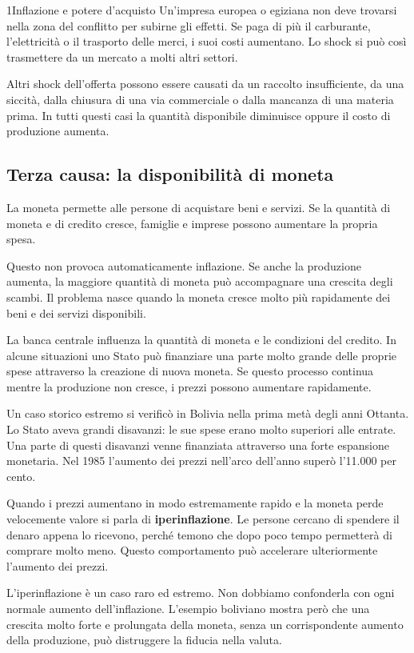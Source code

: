\begin{lettura}{1}{Inflazione e potere d’acquisto}
Un'impresa europea o egiziana non deve trovarsi nella zona del conflitto per subirne gli effetti. Se paga di più il carburante, l'elettricità o il trasporto delle merci, i suoi costi aumentano. Lo shock si può così trasmettere da un mercato a molti altri settori.

Altri shock dell'offerta possono essere causati da un raccolto insufficiente, da una siccità, dalla chiusura di una via commerciale o dalla mancanza di una materia prima. In tutti questi casi la quantità disponibile diminuisce oppure il costo di produzione aumenta.

\subsection*{Terza causa: la disponibilità di moneta}
La moneta permette alle persone di acquistare beni e servizi. Se la quantità di moneta e di credito cresce, famiglie e imprese possono aumentare la propria spesa.

Questo non provoca automaticamente inflazione. Se anche la produzione aumenta, la maggiore quantità di moneta può accompagnare una crescita degli scambi. Il problema nasce quando la moneta cresce molto più rapidamente dei beni e dei servizi disponibili.

La banca centrale influenza la quantità di moneta e le condizioni del credito. In alcune situazioni uno Stato può finanziare una parte molto grande delle proprie spese attraverso la creazione di nuova moneta. Se questo processo continua mentre la produzione non cresce, i prezzi possono aumentare rapidamente.

Un caso storico estremo si verificò in Bolivia nella prima metà degli anni Ottanta. Lo Stato aveva grandi disavanzi: le sue spese erano molto superiori alle entrate. Una parte di questi disavanzi venne finanziata attraverso una forte espansione monetaria. Nel 1985 l'aumento dei prezzi nell'arco dell'anno superò l'11.000 per cento.

Quando i prezzi aumentano in modo estremamente rapido e la moneta perde velocemente valore si parla di \textbf{iperinflazione}. Le persone cercano di spendere il denaro appena lo ricevono, perché temono che dopo poco tempo permetterà di comprare molto meno. Questo comportamento può accelerare ulteriormente l'aumento dei prezzi.

L'iperinflazione è un caso raro ed estremo. Non dobbiamo confonderla con ogni normale aumento dell'inflazione. L'esempio boliviano mostra però che una crescita molto forte e prolungata della moneta, senza un corrispondente aumento della produzione, può distruggere la fiducia nella valuta.


\end{lettura}
